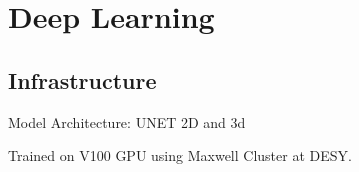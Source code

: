 \chapter{Deep Learning}
\section{Infrastructure}
Model Architecture: UNET 2D and 3d

Trained on V100 GPU using Maxwell Cluster at DESY. 